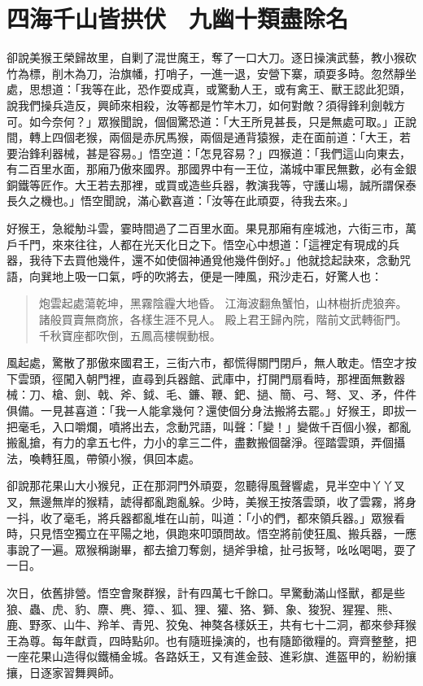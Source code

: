 
\chapter{四海千山皆拱伏　九幽十類盡除名}

卻說美猴王榮歸故里，自剿了混世魔王，奪了一口大刀。逐日操演武藝，教小猴砍竹為標，削木為刀，治旗幡，打哨子，一進一退，安營下寨，頑耍多時。忽然靜坐處，思想道：「我等在此，恐作耍成真，或驚動人王，或有禽王、獸王認此犯頭，說我們操兵造反，興師來相殺，汝等都是竹竿木刀，如何對敵？須得鋒利劍戟方可。如今奈何？」眾猴聞說，個個驚恐道：「大王所見甚長，只是無處可取。」正說間，轉上四個老猴，兩個是赤尻馬猴，兩個是通背猿猴，走在面前道：「大王，若要治鋒利器械，甚是容易。」悟空道：「怎見容易？」四猴道：「我們這山向東去，有二百里水面，那廂乃傲來國界。那國界中有一王位，滿城中軍民無數，必有金銀銅鐵等匠作。大王若去那裡，或買或造些兵器，教演我等，守護山場，誠所謂保泰長久之機也。」悟空聞說，滿心歡喜道：「汝等在此頑耍，待我去來。」

好猴王，急縱觔斗雲，霎時間過了二百里水面。果見那廂有座城池，六街三市，萬戶千門，來來往往，人都在光天化日之下。悟空心中想道：「這裡定有現成的兵器，我待下去買他幾件，還不如使個神通覓他幾件倒好。」他就捻起訣來，念動咒語，向巽地上吸一口氣，呼的吹將去，便是一陣風，飛沙走石，好驚人也：
\begin{quote}
炮雲起處蕩乾坤，黑霧陰霾大地昏。
江海波翻魚蟹怕，山林樹折虎狼奔。
諸般買賣無商旅，各樣生涯不見人。
殿上君王歸內院，階前文武轉衙門。
千秋寶座都吹倒，五鳳高樓幌動根。
\end{quote}

風起處，驚散了那傲來國君王，三街六巿，都慌得關門閉戶，無人敢走。悟空才按下雲頭，徑闖入朝門裡，直尋到兵器館、武庫中，打開門扇看時，那裡面無數器械：刀、槍、劍、戟、斧、鉞、毛、鐮、鞭、鈀、撾、簡、弓、弩、叉、矛，件件俱備。一見甚喜道：「我一人能拿幾何？還使個分身法搬將去罷。」好猴王，即拔一把毫毛，入口嚼爛，噴將出去，念動咒語，叫聲：「變！」變做千百個小猴，都亂搬亂搶，有力的拿五七件，力小的拿三二件，盡數搬個罄淨。徑踏雲頭，弄個攝法，喚轉狂風，帶領小猴，俱回本處。

卻說那花果山大小猴兒，正在那洞門外頑耍，忽聽得風聲響處，見半空中丫丫叉叉，無邊無岸的猴精，諕得都亂跑亂躲。少時，美猴王按落雲頭，收了雲霧，將身一抖，收了毫毛，將兵器都亂堆在山前，叫道：「小的們，都來領兵器。」眾猴看時，只見悟空獨立在平陽之地，俱跑來叩頭問故。悟空將前使狂風、搬兵器，一應事說了一遍。眾猴稱謝畢，都去搶刀奪劍，撾斧爭槍，扯弓扳弩，吆吆喝喝，耍了一日。

次日，依舊排營。悟空會聚群猴，計有四萬七千餘口。早驚動滿山怪獸，都是些狼、蟲、虎、豹、麖、麂、獐、、狐、狸、獾、狢、獅、象、狻猊、猩猩、熊、鹿、野豕、山牛、羚羊、青兕、狡兔、神獒各樣妖王，共有七十二洞，都來參拜猴王為尊。每年獻貢，四時點卯。也有隨班操演的，也有隨節徵糧的。齊齊整整，把一座花果山造得似鐵桶金城。各路妖王，又有進金鼓、進彩旗、進盔甲的，紛紛攘攘，日逐家習舞興師。

